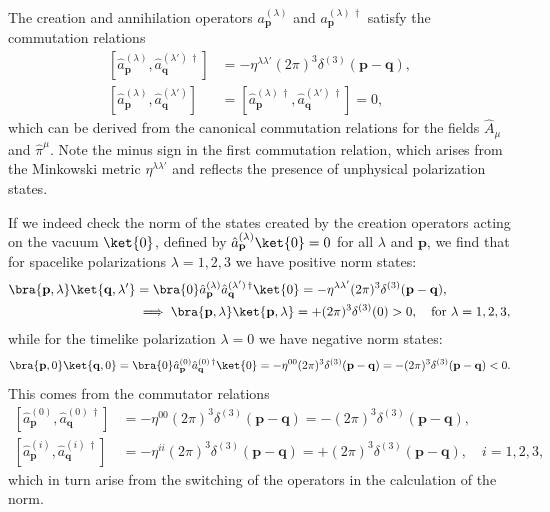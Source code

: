 The creation and annihilation operators \(a^{(\lambda)}_{\mathbf{p}}\) and \(a^{(\lambda)\,\dagger}_{\mathbf{p}}\) satisfy the commutation relations
\[
    \begin{aligned}
        \left[\hat{a}^{(\lambda)}_{\mathbf{p}}, \hat{a}^{(\lambda')\,\dagger}_{\mathbf{q}}\right] & = - \eta^{\lambda \lambda'} (2\pi)^3 \delta^{(3)}(\mathbf{p} - \mathbf{q}),                               \\
        \left[\hat{a}^{(\lambda)}_{\mathbf{p}}, \hat{a}^{(\lambda')}_{\mathbf{q}}\right]          & = \left[\hat{a}^{(\lambda)\,\dagger}_{\mathbf{p}}, \hat{a}^{(\lambda')\,\dagger}_{\mathbf{q}}\right] = 0,
    \end{aligned}
\]
which can be derived from the canonical commutation relations for the fields \(\hat{A}_{\mu}\) and \(\hat{\pi}^{\mu}\). Note the minus sign in the first commutation relation, which arises from the Minkowski metric \(\eta^{\lambda \lambda'}\) and reflects the presence of unphysical polarization states.

If we indeed check the norm of the states created by the creation operators acting on the vacuum \(\ket{0}\), defined by \(\hat{a}^{(\lambda)}_{\mathbf{p}} \ket{0} = 0\) for all \(\lambda\) and \(\mathbf{p}\), we find that for spacelike polarizations \(\lambda = 1, 2, 3\) we have positive norm states:
\[
    \begin{aligned}
        \bra{\mathbf{p}, \lambda} \ket{\mathbf{q}, \lambda'} & = \bra{0} \hat{a}^{(\lambda)}_{\mathbf{p}} \hat{a}^{(\lambda')\,\dagger}_{\mathbf{q}} \ket{0} = -\eta^{\lambda \lambda'} (2\pi)^3 \delta^{(3)}(\mathbf{p} - \mathbf{q}), \\
                                                             & \implies \bra{\mathbf{p}, \lambda} \ket{\mathbf{p}, \lambda} = + (2\pi)^3 \delta^{(3)}(0) > 0, \quad \text{for } \lambda = 1, 2, 3,
    \end{aligned}
\]
while for the timelike polarization \(\lambda = 0\) we have negative norm states:
\[
    \bra{\mathbf{p}, 0} \ket{\mathbf{q}, 0} = \bra{0} \hat{a}^{(0)}_{\mathbf{p}} \hat{a}^{(0)\,\dagger}_{\mathbf{q}} \ket{0} = -\eta^{00} (2\pi)^3 \delta^{(3)}(\mathbf{p} - \mathbf{q}) = - (2\pi)^3 \delta^{(3)}(\mathbf{p} - \mathbf{q}) <0.
\]
This comes from the commutator relations
\[
    \begin{aligned}
        \left[\hat{a}^{(0)}_{\mathbf{p}}, \hat{a}^{(0)\,\dagger}_{\mathbf{q}}\right] & = - \eta^{00} (2\pi)^3 \delta^{(3)}(\mathbf{p} - \mathbf{q}) = - (2\pi)^3 \delta^{(3)}(\mathbf{p} - \mathbf{q}),                    \\
        \left[\hat{a}^{(i)}_{\mathbf{p}}, \hat{a}^{(i)\,\dagger}_{\mathbf{q}}\right] & = - \eta^{ii} (2\pi)^3 \delta^{(3)}(\mathbf{p} - \mathbf{q}) = + (2\pi)^3 \delta^{(3)}(\mathbf{p} - \mathbf{q}), \quad i = 1, 2, 3,
    \end{aligned}
\]
which in turn arise from the switching of the operators in the calculation of the norm.

